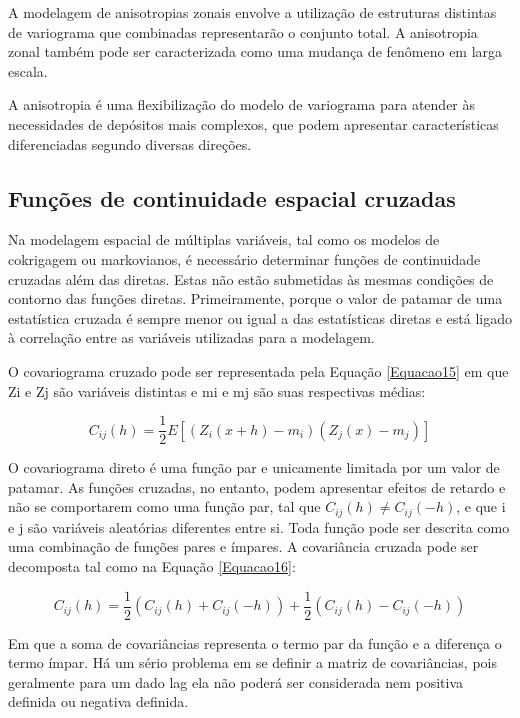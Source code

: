 A modelagem de anisotropias zonais envolve a utilização de estruturas distintas de variograma que combinadas representarão o conjunto total. A anisotropia zonal também pode ser caracterizada como uma mudança de fenômeno em larga escala. 

A anisotropia é uma flexibilização do modelo de variograma para atender às necessidades de depósitos mais complexos, que podem apresentar características diferenciadas segundo diversas direções.

\subsection{Funções de continuidade espacial cruzadas}

Na modelagem espacial de múltiplas variáveis, tal como os modelos de cokrigagem ou markovianos, é necessário determinar funções de continuidade cruzadas além das diretas. Estas não estão submetidas às mesmas condições de contorno das funções diretas. Primeiramente, porque o valor de patamar de uma estatística cruzada é sempre menor ou igual a das estatísticas diretas e está ligado à correlação entre as variáveis utilizadas para a modelagem.  

O covariograma cruzado pode ser representada pela Equação \ref{Equacao15} em que Zi e Zj são variáveis distintas e mi e mj são suas respectivas médias: 

\begin{equation}\label{Equacao15}
C_{ij}(h) = \frac{1}{2} E\left[ \left( Z_i(x+h) -m_i \right) \left( Z_j(x) -m_j \right)\right] 
\end{equation}

O covariograma direto é uma função par e unicamente limitada por um valor de patamar. As funções cruzadas, no entanto, podem apresentar efeitos de retardo e não se comportarem como uma função par, tal que $C_{ij} (h)\neq C_{ij} (-h)$, e que i e j são variáveis aleatórias diferentes entre si. 
Toda função pode ser descrita como uma combinação de funções pares e ímpares. A covariância cruzada pode ser decomposta tal como na Equação \ref{Equacao16}:

\begin{equation}\label{Equacao16}
C_{ij}(h) = \frac{1}{2}\left( C_{ij}(h)+C_{ij}(-h)\right) +\frac{1}{2}\left( C_{ij}(h)-C_{ij}(-h)\right)
\end{equation}

Em que a soma de covariâncias representa o termo par da função e a diferença o termo ímpar. Há um sério problema em se definir a matriz de covariâncias, pois geralmente para um dado lag ela não poderá ser considerada nem positiva definida ou negativa definida. 

